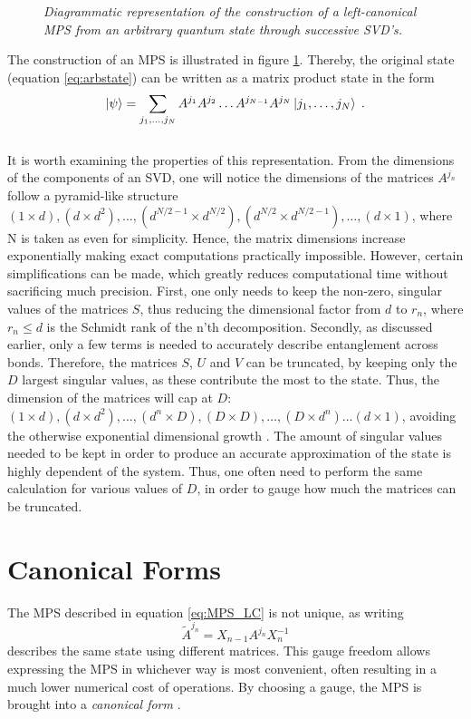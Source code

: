 \begin{figure}[h!]
	\centering
	
	\caption{\textit{Diagrammatic representation of the construction of a left-canonical MPS from an arbitrary quantum state through successive SVD's.}}
	\label{fig:MPSbuild}
\end{figure}
The construction of an MPS is illustrated in figure \ref{fig:MPSbuild}. Thereby, the original state (equation \ref{eq:arbstate}) can be written as a matrix product state in the form \cite{schollwock}
\begin{equation}
	\ket{\psi} = \sum_{j_1, \ldots, j_N} A^{j_1} A^{j_2} \ldots A^{j_{N-1}} A^{j_{N}} \ket{j_1, \ldots, j_N} \; .
	\label{eq:MPS_LC} 
\end{equation}
\\
It is worth examining the properties of this representation. From the dimensions of the components of an SVD, one will notice the dimensions of the matrices $A^{j_n}$ follow a pyramid-like structure $(1 \times d ),(d \times d^2) , \ldots , (d^{N/2 -1} \times d^{N/2}) , (d^{N/2} \times d^{N/2 -1 }), \ldots , (d \times 1)$, where N is taken as even for simplicity. Hence, the matrix dimensions increase exponentially making exact computations practically impossible. However, certain simplifications can be made, which greatly reduces computational time without sacrificing much precision. First, one only needs to keep the non-zero, singular values of the matrices $S$, thus reducing the dimensional factor from $d$ to $r_n$, where $r_n \leq d$ is the Schmidt rank of the n'th decomposition. Secondly, as discussed earlier, only a few terms is needed to accurately describe entanglement across bonds. Therefore, the matrices $S$, $U$ and $V$ can be truncated, by keeping only the $D$ largest singular values, as these contribute the most to the state. Thus, the dimension of the matrices will cap at $D$: $(1 \times d ),(d \times d^2) , \ldots , (d^{n} \times D) , (D \times D), \ldots , ( D \times d^{n}) \ldots  (d \times 1)$, avoiding the otherwise exponential dimensional growth \cite{EntropyScaling}. The amount of singular values needed to be kept in order to produce an accurate approximation of the state is highly dependent of the system. Thus, one often need to perform the same calculation for various values of $D$, in order to gauge how much the matrices can be truncated.


\section{Canonical Forms}
\label{sec:canonical}
The MPS described in equation \ref{eq:MPS_LC} is not unique, as writing 
\begin{equation}
	\tilde{A}^{j_n} = X_{n-1} A^{j_n} X_{n}^{-1}
\end{equation}
describes the same state using different matrices. This gauge freedom allows expressing the MPS in whichever way is most convenient, often resulting in a much lower numerical cost of operations. By choosing a gauge, the MPS is brought into a \textit{canonical form} \cite{Vidal2007}.

